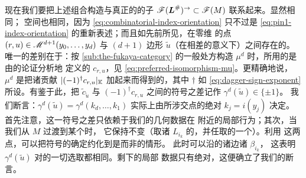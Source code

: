 现在我们要把上述组合构造与真正的\trFukayaCategory{}的\trDirected{}子\trCategory{}
$\mathscr{F}(\boldsymbol{L}^{\#})^{\to}\subset\mathscr{F}(M)$ 联系起来。\trObject{}显然相同；%
\trMorphism{}空间也相同，因为 \eqref{eq:combinatorial-index-orientation} 只不过是%
\eqref{eq:pin1-index-orientation} 的重新表述；而且如先前所见，在零维\trModuliSpace{}%
的点 $(r,u)\in\mathscr{M}^{d+1}(y_0,\ldots,y_d)$ 与\trImmersion{} $(d{+}1)$ 边形%
$\tilde{u}$（在相差\trParametrization{}的意义下）之间存在\trCanonical{}的\trBijective。%
唯一的差别在于：按 \cref{sub:the-fukaya-category} 的一般处方构造\trAinfty{}%
\trStructureMap{} $\mu^d$ 时，所用的是由\trDeterminantLine{}的\trGluing{}论证分析地%
定义的\trIsomorphism{} $c_{r,u}$，见 \eqref{eq:preferred-isomorphism-mu}。更精确地说，%
$\mu^d$ 是把诸贡献 $|(-1)^{\dagger}c_{r,u}|_{\mathbb{K}}$ 加起来而得到的，其中 $\dagger$ 如%
\eqref{eq:dagger-sign-exponent} 所设。有鉴于此，把 $\tilde{c}_{\tilde{u}}$ 与%
$(-1)^{\dagger}c_{r,u}$ 之间的符号之差记作 $\gamma^d(\tilde{u})\in\{\pm 1\}$。
我们断言：$\gamma^d(\tilde{u})=\gamma^d(k_d,\ldots,k_1)$ 实际上由所涉交点的绝对%
\trIndex{} $k_j=i(y_j)$ 决定。首先注意，这一符号之差只依赖于我们的几何数据在%
\trImmersion\trPolygon{}附近的局部行为；其次，当我们从 $M$ 过渡到某个\trCovering{}时，%
它保持不变（取诸 $L_{i_k}$ 的\trPreimage，并任取\trPolygon{}的一个\trLift）。利用%
这两点，可以把符号的确定约化到\trPolygon{}是\trEmbedding{}而非\trImmersion{}的情形。%
此时可以沿\trPolygon{}的诸边\trTrivialization{}诸\trLineBundle{} $\beta_{i_k}$，%
这表明 $\gamma^d(\tilde{u})$ 对\trLineBundle{}的一切选取都相同。剩下的局部%
\trTopology{}数据只有绝对\trIndex，这便确立了我们的断言。
